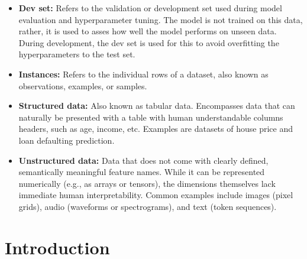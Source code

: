 \documentclass[12pt,openany]{book}
\begin{document}
\begin{itemize}
    \item \textbf{Dev set:} Refers to the validation or development set used during model evaluation and hyperparameter tuning. The model is not trained on this data, rather, it is used to asses how well the model performs on unseen data. During development, the dev set is used for this to avoid overfitting the hyperparameters to the test set.
    \item \textbf{Instances:} Refers to the individual rows of a dataset, also known as observations, examples, or samples. 
    \item \textbf{Structured data:} Also known as tabular data. Encompasses data that can naturally be presented with a table with human understandable columns headers, such as age, income, etc. Examples are datasets of house price and loan defaulting prediction.
    \item \textbf{Unstructured data:} Data that does not come with clearly defined, semantically meaningful feature names. While it can be represented numerically (e.g., as arrays or tensors), the dimensions themselves lack immediate human interpretability. Common examples include images (pixel grids), audio (waveforms or spectrograms), and text (token sequences). 
\end{itemize}






\section{Introduction}
\end{document}
